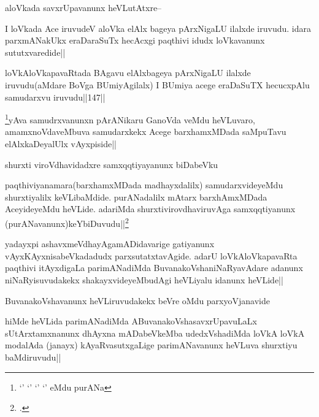 \begin{artha}
aloVkada savxrUpavanunx heVLutAtxre--
\end{artha}

\begin{artha}
I loVkada Ace iruvudeV aloVka elAlx bageya pArxNigaLU ilalxde iruvudu. idara parxmANakUkx eraDaraSuTx hecAcxgi paqthivi idudx loVkavanunx sututxvaredide||
\end{artha}

\begin{artha}
loVkAloVkapavaRtada BAgavu elAlxbageya pArxNigaLU ilalxde iruvudu(aMdare BoVga BUmiyAgilalx) I BUmiya acege eraDaSuTX hecucxpAlu samudarxvu iruvudu||147||
\end{artha}
\begin{artha}
\footnote{`\stext' `\stext' `\stext' `\stext' eMdu purANa}yAva samudrxvanunxn pArANikaru GanoVda veMdu heVLuvaro, amamxnoVdaveMbuva samudarxkekx Acege barxhamxMDada saMpuTavu elAlxkaDeyalUlx vAyxpiside||
\end{artha}

\begin{artha}
shurxti viroVdhavidadxre samxqqtiyayanunx biDabeVku
\end{artha}

\begin{artha}
paqthiviyanamara(barxhamxMDada madhayxdalilx) samudarxvideyeMdu shurxtiyalilx keVLibaMdide. purANadalilx mAtarx barxhAmxMDada AceyideyeMdu heVLide. adariMda shurxtivirovdhaviruvAga samxqqtiyanunx (purANavanunx)keYbiDuvudu||\footnote{\stext. \stext \stext \stext}
\end{artha}

\begin{artha}
yadayxpi ashavxmeVdhayAgamADidavarige gatiyanunx vAyxKAyxnisabeVkadadudx parxsutatxtavAgide. adarU loVkAloVkapavaRta paqthivi itAyxdigaLa parimANadiMda BuvanakoVshaniNaRyavAdare adanunx niNaRyisuvudakekx shakayxvideyeMbudAgi heVLiyalu idanunx heVLide||
\end{artha}

\begin{artha}
BuvanakoVshavanunx heVLiruvudakekx beVre oMdu parxyoVjanavide
\end{artha}

\begin{artha}
hiMde heVLida parimANadiMda ABuvanakoVshasavxrUpavuLaLx sUtArxtamxnanunx dhAyxna mADabeVkeMba udedxVshadiMda loVkA loVkA modalAda (janayx) kAyaRvasutxgaLige parimANavanunx heVLuva shurxtiyu baMdiruvudu||
\end{artha}


